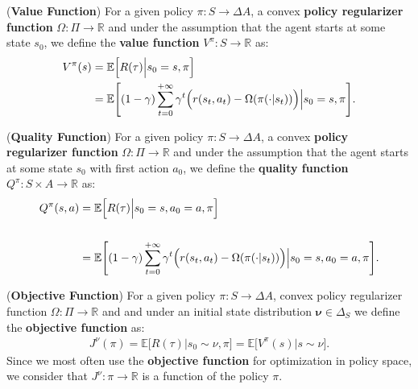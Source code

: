 \begin{definition}
    (\textbf{Value Function})
    For a given policy $\pi:S\rightarrow \Delta A$, a convex \textbf{policy regularizer function} $\Omega: \Pi \rightarrow \mathbb{R}$ and under the assumption that the agent starts at some state $s_0$, we define the \textbf{value function} $V^\pi:S\rightarrow \mathbb{R}$ as:
    \begin{align*}
        V^\pi(s) &= \mathbb{E}\Big[ R(\tau) \Big| s_0  = s, \pi \Big] \\
         &= \mathbb{E}\Bigg[ (1-\gamma) \sum_{t=0}^{+\infty} \gamma^t \Bigl(  r(s_t,a_t) - \Omega(\pi(\cdot|s_t))  \Bigr) \Big| s_0  = s, \pi \Bigg].
    \end{align*}
\end{definition}

\begin{definition}
    (\textbf{Quality Function})
    For a given policy $\pi:S\rightarrow \Delta A$, a convex \textbf{policy regularizer function} $\Omega: \Pi \rightarrow \mathbb{R}$ and under the assumption that the agent starts at some state $s_0$ with first action $a_0$, we define the \textbf{quality function} $Q^\pi:S\times A \rightarrow \mathbb{R}$ as:
    \begin{align*}
        Q^\pi(s,a) &= \mathbb{E}\Big[ R(\tau) \Big| s_0  = s, a_0  = a, \pi \Big] \\
        \\ &= \mathbb{E}\Bigg[ (1-\gamma) \sum_{t=0}^{+\infty} \gamma^t \Bigl( r(s_t,a_t) - \Omega(\pi(\cdot|s_t))  \Bigr)  \Big| s_0  = s, a_0 = a, \pi \Bigg].
    \end{align*}
\end{definition}

\begin{definition}
    (\textbf{Objective Function})
    For a given policy $\pi:S\rightarrow \Delta A$, convex policy regularizer function $\Omega: \Pi \rightarrow \mathbb{R}$ and and under an initial state distribution $\bm{\nu} \in \Delta_S$ we define the \textbf{objective function} as:
    \begin{align*}
        J^\nu(\pi) = \mathbb{E}\Big[ R(\tau) \Big| s_0 \sim \nu, \pi \Big] =  \mathbb{E}\Big[ V^\pi(s) \Big| s \sim \nu\Big].
    \end{align*}
    Since we most often use the \textbf{objective function} for optimization in policy space, we consider that $J^\nu:\pi \rightarrow \mathbb{R}$ is a function of the policy $\pi$.
\end{definition}

